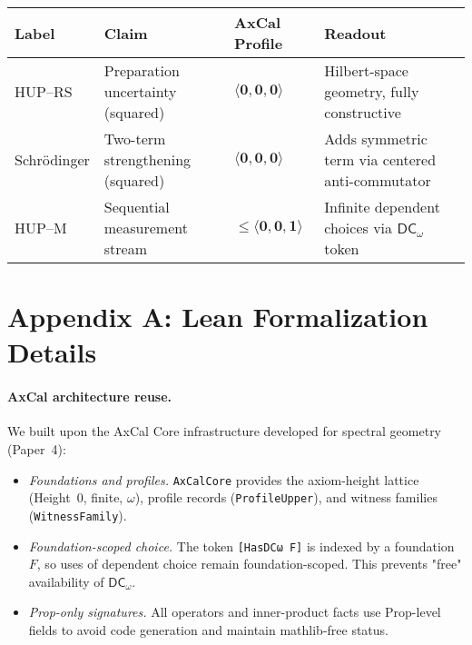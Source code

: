 \documentclass[11pt]{article}
\newcommand{\DCw}{\mathsf{DC}_{\omega}}
\newcommand{\hzero}{\mathbf{0}}
\newcommand{\hone}{\mathbf{1}}
\newcommand{\allzero}{\langle \hzero,\hzero,\hzero\rangle}
\newcommand{\DCwonly}{\langle \hzero,\hzero,\hone\rangle}
\newcommand{\lean}[1]{\texttt{#1}}
\theoremstyle{plain}
\theoremstyle{definition}
\theoremstyle{remark}
\begin{document}
\begin{center}
\begin{tabular}{@{}llll@{}}
\toprule
\textbf{Label} & \textbf{Claim} & \textbf{AxCal Profile} & \textbf{Readout} \\
\midrule
HUP--RS & Preparation uncertainty (squared) & $\allzero$ &
Hilbert-space geometry, fully constructive \\
Schrödinger & Two-term strengthening (squared) & $\allzero$ &
Adds symmetric term via centered anti-commutator \\
HUP--M & Sequential measurement stream & $\le \DCwonly$ &
Infinite dependent choices via $\DCw$ token \\
\bottomrule
\end{tabular}
\end{center}

\section*{Appendix A: Lean Formalization Details}
\label{sec:engineering}

\paragraph{AxCal architecture reuse.}
We built upon the AxCal Core infrastructure developed for spectral geometry (Paper~4):
\begin{itemize}
  \item \emph{Foundations and profiles.} \lean{AxCalCore} provides the axiom-height lattice (Height~0, finite, $\omega$), profile records (\lean{ProfileUpper}), and witness families (\lean{WitnessFamily}).
  \item \emph{Foundation-scoped choice.} The token \lean{[HasDCω F]} is indexed by a foundation $F$, so uses of dependent choice remain foundation-scoped. This prevents "free" availability of $\DCw$.
  \item \emph{Prop-only signatures.} All operators and inner-product facts use Prop-level fields to avoid code generation and maintain mathlib-free status.
\end{itemize}
\end{document}
